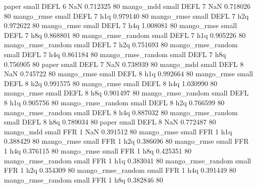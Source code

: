             paper      small     DEFL                 6                  NaN 0.712325 80
        mango_mdd      small     DEFL                 7                  NaN 0.718026 80
       mango_rmse      small     DEFL                 7                  h1q 0.979140 80
       mango_rmse      small     DEFL                 7                  h2q 0.972622 80
       mango_rmse      small     DEFL                 7                  h4q 1.008081 80
       mango_rmse      small     DEFL                 7                  h8q 0.868801 80
mango_rmse_random      small     DEFL                 7                  h1q 0.905226 80
mango_rmse_random      small     DEFL                 7                  h2q 0.751693 80
mango_rmse_random      small     DEFL                 7                  h4q 0.861184 80
mango_rmse_random      small     DEFL                 7                  h8q 0.756905 80
            paper      small     DEFL                 7                  NaN 0.738939 80
        mango_mdd      small     DEFL                 8                  NaN 0.745722 80
       mango_rmse      small     DEFL                 8                  h1q 0.992664 80
       mango_rmse      small     DEFL                 8                  h2q 0.991575 80
       mango_rmse      small     DEFL                 8                  h4q 1.030990 80
       mango_rmse      small     DEFL                 8                  h8q 0.901497 80
mango_rmse_random      small     DEFL                 8                  h1q 0.905756 80
mango_rmse_random      small     DEFL                 8                  h2q 0.766599 80
mango_rmse_random      small     DEFL                 8                  h4q 0.887032 80
mango_rmse_random      small     DEFL                 8                  h8q 0.789034 80
            paper      small     DEFL                 8                  NaN 0.772487 80
        mango_mdd      small      FFR                 1                  NaN 0.391512 80
       mango_rmse      small      FFR                 1                  h1q 0.388429 80
       mango_rmse      small      FFR                 1                  h2q 0.386696 80
       mango_rmse      small      FFR                 1                  h4q 0.376115 80
       mango_rmse      small      FFR                 1                  h8q 0.425351 80
mango_rmse_random      small      FFR                 1                  h1q 0.383041 80
mango_rmse_random      small      FFR                 1                  h2q 0.354309 80
mango_rmse_random      small      FFR                 1                  h4q 0.391449 80
mango_rmse_random      small      FFR                 1                  h8q 0.382846 80
